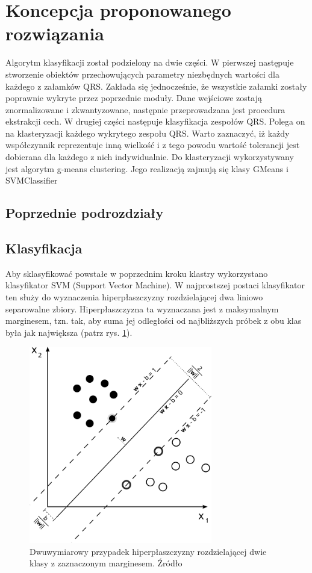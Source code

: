 \section{Koncepcja proponowanego rozwiązania}

\qquad Algorytm klasyfikacji został podzielony na dwie części. W pierwszej następuje stworzenie obiektów przechowujących parametry niezbędnych wartości dla każdego z załamków QRS. Zakłada się jednocześnie, że wszystkie załamki zostały poprawnie wykryte przez poprzednie moduły. Dane wejściowe zostają znormalizowane i zkwantyzowane, następnie przeprowadzana jest procedura ekstrakcji cech. W drugiej części następuje klasyfikacja zespołów QRS. Polega on na  klasteryzacji każdego wykrytego zespołu QRS. Warto zaznaczyć, iż każdy współczynnik reprezentuje inną wielkość i z tego powodu wartość tolerancji jest dobierana dla każdego z nich indywidualnie. Do klasteryzacji wykorzystywany jest algorytm g-means clustering. Jego realizacją zajmują się klasy GMeans i SVMClassifier

\subsection{Poprzednie podrozdziały}

\subsection{Klasyfikacja}

\qquad Aby sklasyfikować powstałe w poprzednim kroku klastry wykorzystano klasyfikator SVM (Support Vector Machine). W najprostszej postaci klasyfikator ten służy do wyznaczenia hiperpłaszczyzny rozdzielającej dwa liniowo separowalne zbiory. Hiperpłaszczyzna ta wyznaczana jest z maksymalnym marginesem, tzn. tak, aby suma jej odległości od najbliższych próbek z obu klas była jak największa (patrz rys. \ref{fig:SVM}).

\begin{figure}[h]
	\centering
	\includegraphics[width=8cm]{Grafika/Svm_max_sep_hyperplane_with_margin}
	\caption{Dwuwymiarowy przypadek hiperpłaszczyzny rozdzielającej dwie klasy z zaznaczonym marginesem. Źródło \cite{SVMWiki}}
	\label{fig:SVM}
\end{figure}

